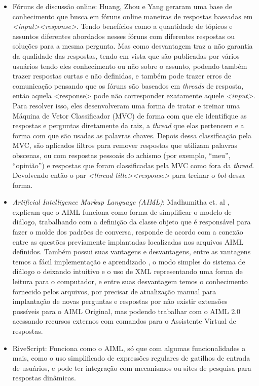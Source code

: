 \documentclass[
	12pt,				%
	oneside,
	a4paper,			%
	english,			%
	french,				%
	spanish,			%
	brazil				%
	]{abntex2}
\begin{document}
\begin{itemize}
	\item Fóruns de discussão online: Huang, Zhou e Yang\supercite{oline-foruns-database} geraram uma base de conhecimento que busca em fóruns online maneiras de respostas baseadas em \emph{<input><response>}. Tendo benefícios como a quantidade de tópicos e assuntos diferentes abordados nesses fóruns com diferentes respostas ou soluções para a mesma pergunta. Mas como desvantagem traz a não garantia da qualidade das respostas, tendo em vista que são publicadas por vários usuários tendo eles conhecimento ou não sobre o assunto, podendo também trazer respostas curtas e não definidas, e também pode trazer erros de comunicação pensando que os fóruns são baseados em \emph{threads} de resposta, então aquela <response> pode não corresponder exatamente aquele \emph{<input>}. Para resolver isso, eles desenvolveram uma forma de tratar e treinar uma Máquina de Vetor Classificador (MVC) de forma com que ele identifique as respostas e perguntas diretamente da raiz, a \emph{thread} que elas pertencem e a forma com que são usadas as palavras chaves. Depois dessa classificação pela MVC, são aplicados filtros para remover respostas que utilizam palavras obscenas, ou com respostas pessoais do achismo (por exemplo, “meu”, “opinião”) e respostas que foram classificadas pela MVC como fora da \emph{thread}. Devolvendo então o par \emph{<thread title><response>} para treinar o \emph{bot} dessa forma.

	\item \emph{Artificial Intelligence Markup Language (AIML)}: Madhumitha et. al \supercite{AIML}, explicam que o AIML funciona como forma de simplificar o modelo de diálogo, trabalhando com a definição da classe objeto que é responsável para fazer o molde dos padrões de conversa, responde de acordo com a conexão entre as questões previamente implantadas localizadas nos arquivos AIML definidos. Também possui suas vantagens e desvantagens, entre as vantagens temos a fácil implementação e aprendizado , o modo simples do sistema de diálogo o deixando intuitivo e o uso de XML representando uma forma de leitura para o computador, e entre suas desvantagem temos o conhecimento fornecido pelos arquivos, por precisar de atualização manual para implantação de novas perguntas e respostas por não existir extensões possíveis para o AIML Original, mas podendo trabalhar com o AIML 2.0 acessando recursos externos com comandos para o Assistente Virtual de respostas.
	\item RiveScript: Funciona como o AIML, só que com algumas funcionalidades a mais, como o uso simplificado de expressões regulares de gatilhos de entrada de usuários, e pode ter integração com mecanismos ou sites de pesquisa para respostas dinâmicas.
\end{itemize} 
\end{document}

